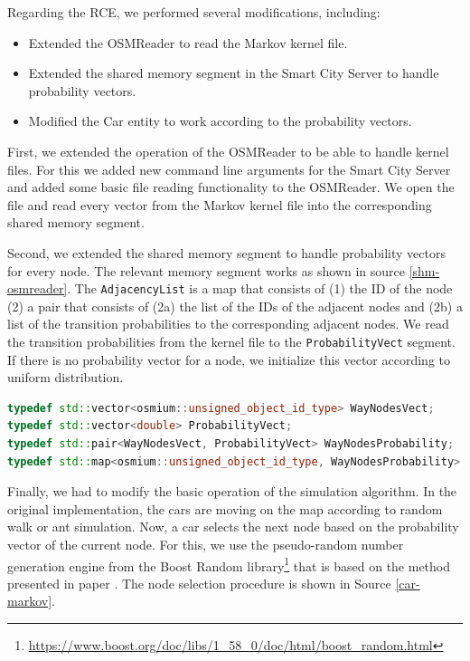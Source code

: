 \documentclass[b5paper,12pt]{report}
\theoremstyle{definition}
\begin{document}
Regarding the RCE, we performed several modifications, including:
\begin{itemize}
    \item Extended the OSMReader to read the Markov kernel file.
    \item Extended the shared memory segment in the Smart City Server to handle probability vectors.
    \item Modified the Car entity to work according to the probability vectors.
\end{itemize} 

First, we extended the operation of the OSMReader to be able to handle kernel files. For this we added new command line arguments for the Smart City Server and added some basic file reading functionality to the OSMReader. We open the file and read every vector from the Markov kernel file into the corresponding shared memory segment.

Second, we extended the shared memory segment to handle probability vectors for every node. The relevant memory segment works as shown in source \ref{shm-osmreader}. The \texttt{AdjacencyList} is a map that consists of (1) the ID of the node (2) a pair that consists of (2a) the list of the IDs of the adjacent nodes and (2b) a list of the transition probabilities to the corresponding adjacent nodes. We read the transition probabilities from the kernel file to the \texttt{ProbabilityVect} segment. If there is no probability vector for a node, we initialize this vector according to uniform distribution.

\begin{lstlisting}[language=C++,caption=The shared memory segment of a Markov traffic., label=shm-osmreader, escapechar={|}]
typedef std::vector<osmium::unsigned_object_id_type> WayNodesVect;
typedef std::vector<double> ProbabilityVect;
typedef std::pair<WayNodesVect, ProbabilityVect> WayNodesProbability;
typedef std::map<osmium::unsigned_object_id_type, WayNodesProbability> AdjacencyList;
\end{lstlisting}

Finally, we had to modify the basic operation of the simulation algorithm. In the original implementation, the cars are moving on the map according to random walk or ant simulation. Now, a car selects the next node based on the probability vector of the current node. For this, we use the pseudo-random number generation engine from the Boost Random library\footnote{\url{https://www.boost.org/doc/libs/1_58_0/doc/html/boost_random.html}} that is based on the method presented in paper \cite{Matsumoto}. The node selection procedure is shown in Source \ref{car-markov}.
\end{document}

